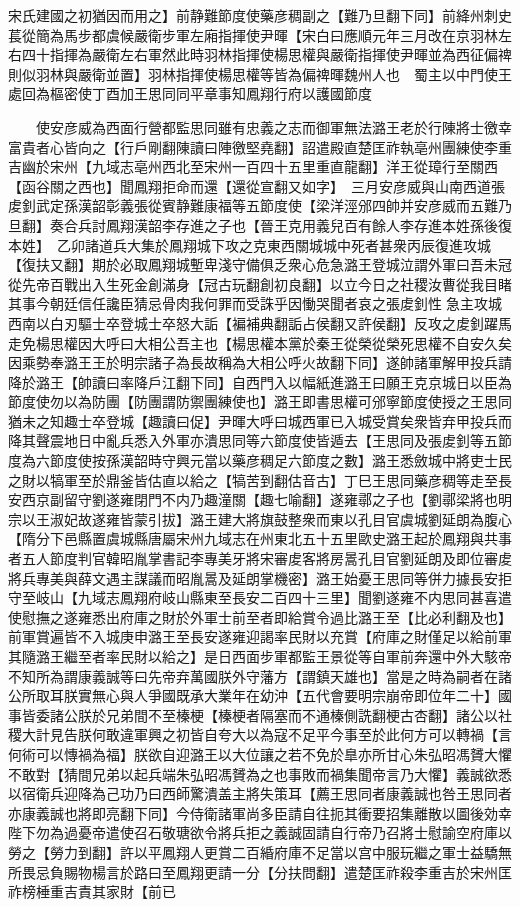 宋氏建國之初猶因而用之】前静難節度使藥彦稠副之【難乃旦翻下同】前絳州刺史萇從簡為馬步都虞候嚴衛步軍左廂指揮使尹暉【宋白曰應順元年三月改在京羽林左右四十指揮為嚴衛左右軍然此時羽林指揮使楊思權與嚴衛指揮使尹暉並為西征偏禆則似羽林與嚴衛並置】羽林指揮使楊思權等皆為偏禆暉魏州人也　蜀主以中門使王處回為樞密使丁酉加王思同同平章事知鳳翔行府以護國節度

　　使安彦威為西面行營都監思同雖有忠義之志而御軍無法潞王老於行陳將士徼幸富貴者心皆向之【行戶剛翻陳讀曰陣徼堅堯翻】詔遣殿直楚匡祚執亳州團練使李重吉幽於宋州【九域志亳州西北至宋州一百四十五里重直龍翻】洋王從璋行至關西【函谷關之西也】聞鳳翔拒命而還【還從宣翻又如字】　三月安彦威與山南西道張䖍釗武定孫漢韶彰義張從賓静難康福等五節度使【梁洋涇邠四帥并安彦威而五難乃旦翻】奏合兵討鳳翔漢韶李存進之子也【晉王克用義兒百有餘人李存進本姓孫後復本姓】　乙卯諸道兵大集於鳳翔城下攻之克東西關城城中死者甚衆丙辰復進攻城【復扶又翻】期於必取鳳翔城塹卑淺守備俱乏衆心危急潞王登城泣謂外軍曰吾未冠從先帝百戰出入生死金創滿身【冠古玩翻創初良翻】以立今日之社稷汝曹從我目睹其事今朝廷信任讒臣猜忌骨肉我何罪而受誅乎因慟哭聞者哀之張䖍釗性急主攻城西南以白刃驅士卒登城士卒怒大詬【褊補典翻詬占侯翻又許侯翻】反攻之䖍釗躍馬走免楊思權因大呼曰大相公吾主也【楊思權本黨於秦王從榮從榮死思權不自安久矣因乘勢奉潞王王於明宗諸子為長故稱為大相公呼火故翻下同】遂帥諸軍解甲投兵請降於潞王【帥讀曰率降戶江翻下同】自西門入以幅紙進潞王曰願王克京城日以臣為節度使勿以為防團【防團謂防禦團練使也】潞王即書思權可邠寧節度使授之王思同猶未之知趣士卒登城【趣讀曰促】尹暉大呼曰城西軍已入城受賞矣衆皆弃甲投兵而降其聲震地日中亂兵悉入外軍亦潰思同等六節度使皆遁去【王思同及張䖍釗等五節度為六節度使按孫漢韶時守興元當以藥彦稠足六節度之數】潞王悉斂城中將吏士民之財以犒軍至於鼎釜皆估直以給之【犒苦到翻估音古】丁巳王思同藥彦稠等走至長安西京副留守劉遂雍閉門不内乃趣潼關【趣七喻翻】遂雍鄩之子也【劉鄩梁將也明宗以王淑妃故遂雍皆蒙引拔】潞王建大將旗鼓整衆而東以孔目官虞城劉延朗為腹心【隋分下邑縣置虞城縣唐屬宋州九域志在州東北五十五里歐史潞王起於鳳翔與共事者五人節度判官韓昭胤掌書記李專美牙將宋審䖍客將房暠孔目官劉延朗及即位審䖍將兵專美與薛文遇主謀議而昭胤暠及延朗掌機密】潞王始憂王思同等併力據長安拒守至岐山【九域志鳳翔府岐山縣東至長安二百四十三里】聞劉遂雍不内思同甚喜遣使慰撫之遂雍悉出府庫之財於外軍士前至者即給賞令過比潞王至【比必利翻及也】前軍賞遍皆不入城庚申潞王至長安遂雍迎謁率民財以充賞【府庫之財僅足以給前軍其隨潞王繼至者率民財以給之】是日西面步軍都監王景從等自軍前奔還中外大駭帝不知所為謂康義誠等曰先帝弃萬國朕外守藩方【謂鎮天雄也】當是之時為嗣者在諸公所取耳朕實無心與人爭國既承大業年在幼沖【五代會要明宗崩帝即位年二十】國事皆委諸公朕於兄弟間不至榛梗【榛梗者隔塞而不通榛側詵翻梗古杏翻】諸公以社稷大計見告朕何敢違軍興之初皆自夸大以為寇不足平今事至於此何方可以轉禍【言何術可以慱禍為福】朕欲自迎潞王以大位讓之若不免於臯亦所甘心朱弘昭馮贇大懼不敢對【猜間兄弟以起兵端朱弘昭馮贇為之也事敗而禍集聞帝言乃大懼】義誠欲悉以宿衛兵迎降為己功乃曰西師驚潰盖主將失策耳【薦王思同者康義誠也咎王思同者亦康義誠也將即亮翻下同】今侍衛諸軍尚多臣請自往扼其衝要招集離散以圖後効幸陛下勿為過憂帝遣使召石敬瑭欲令將兵拒之義誠固請自行帝乃召將士慰諭空府庫以勞之【勞力到翻】許以平鳳翔人更賞二百緍府庫不足當以宫中服玩繼之軍士益驕無所畏忌負賜物楊言於路曰至鳳翔更請一分【分扶問翻】遣楚匡祚殺李重吉於宋州匡祚榜棰重吉責其家財【前已